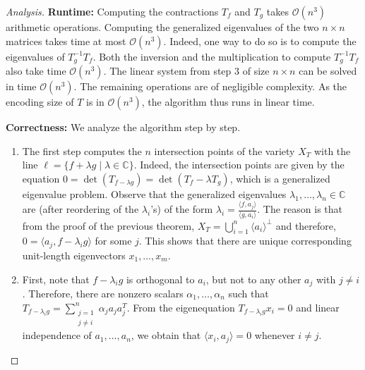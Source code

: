 \begin{proof}[Analysis]
	\textbf{Runtime:} Computing the contractions $ T_f $ and $ T_g $ takes $ \mathcal{O}(n^3) $ arithmetic operations. Computing the generalized eigenvalues of the two $ n\times n $ matrices takes time at most $ \mathcal{O}(n^3) $. Indeed, one way to do so is to compute the eigenvalues of $ T_g^{-1}T_f $. Both the inversion and the multiplication to compute $ T_g^{-1}T_f $ also take time $ \mathcal{O}(n^3) $. The linear system from step 3 of size $ n\times n $ can be solved in time $ \mathcal{O}(n^3) $. The remaining operations are of negligible complexity. As the encoding size of $ T $ is in $ \mathcal{O}(n^3) $, the algorithm thus runs in linear time. 
	
	\smallskip\noindent
	\textbf{Correctness: } We analyze the algorithm step by step. 
	\begin{enumerate}
		\item The first step computes the $ n $ intersection points of the variety $ X_T $ with the line $ \ell= \{f+\lambda g \mid \lambda\in \mathbb{C}\} $. Indeed, the intersection points are given by the equation $ 0 = \det(T_{f-\lambda g}) = \det(T_{f} - \lambda T_{g}) $, which is a generalized eigenvalue problem. Observe that the generalized eigenvalues $ \lambda_1,\ldots,\lambda_n \in \mathbb{C} $ are (after reordering of the $ \lambda_i $'s) of the form $ \lambda_i = \frac{\langle f, a_j \rangle}{\langle g,a_i \rangle} $. The reason is that from the proof of the previous theorem, $ X_T = \bigcup_{i = 1}^n \langle a_i \rangle^{\perp} $ and therefore, $ 0 = \langle a_j, f-\lambda_ig \rangle $ for some $ j $. 
		This shows that there are unique corresponding unit-length eigenvectors $ x_1,\ldots,x_m $. 
		\item First, note that $ f-\lambda_ig $ is orthogonal to $ a_i $, but not to any other $ a_j $ with $ j\ne i $. Therefore, there are nonzero scalars $ \alpha_1,\ldots,\alpha_n $ such that $ T_{f-\lambda_ig} = \sum_{\substack{j = 1\\j\ne i}}^{n} \alpha_ja_ja_j^{T}$. From the eigenequation $ T_{f-\lambda_ig} x_i = 0 $ and linear independence of $ a_1,\ldots,a_n $, we obtain that $ \langle x_i, a_j \rangle = 0 $ whenever $ i\ne j $. 
		

\end{enumerate}
\end{proof}
